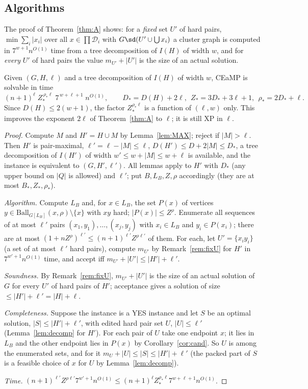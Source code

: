 \subsection{Algorithms}
\begin{remark}\label{rem:fixU}
The proof of Theorem~\ref{thm:A} shows: for a \emph{fixed} set $U'$ of hard pairs, $\min\sum_i|x_i|$ over all $x\in\prod\mathcal D_i$ with $G\sd(U'\cup\bigcup x_i)$ a cluster graph is computed in $7^{w+1}n^{O(1)}$ time from a tree decomposition of $I(H)$ of width $w$, and for \emph{every} $U'$ of hard pairs the value $m_{U'}+|U'|$ is the size of an actual solution.
\end{remark}

\begin{theorem}\label{thm:nl}
Given $(G,H,\ell)$ and a tree decomposition of $I(H)$ of width $w$, CEaMP is solvable in time
\[
(n+1)^{\ell}\;Z_*^{\,\rho_*\ell}\;7^{\,w+\ell+1}\;n^{O(1)},\qquad D_*=D(H)+2\ell,\ \ Z_*=3D_*+3\ell+1,\ \ \rho_*=2D_*+\ell .
\]
Since $D(H)\le2(w+1)$, the factor $Z_*^{\rho_*\ell}$ is a function of $(\ell,w)$ only. This improves the exponent $2\ell$ of Theorem~\ref{thm:A} to $\ell$; it is still XP in $\ell$.
\end{theorem}
\begin{proof}
Compute $M$ and $H'=H\cup M$ by Lemma~\ref{lem:MAX}; reject if $|M|>\ell$. Then $H'$ is pair-maximal, $\ell'=\ell-|M|\le\ell$, $D(H')\le D+2|M|\le D_*$, a tree decomposition of $I(H')$ of width $w'\le w+|M|\le w+\ell$ is available, and the instance is equivalent to $(G,H',\ell')$. All lemmas apply to $H'$ with $D_*$ (any upper bound on $|Q|$ is allowed) and $\ell'$; put $B,L_B,Z,\rho$ accordingly (they are at most $B_*,Z_*,\rho_*$).

\emph{Algorithm.} Compute $L_B$ and, for $x\in L_B$, the set $P(x)$ of vertices $y\in\mathrm{Ball}_{G[L_B]}(x,\rho)\setminus\{x\}$ with $xy$ hard; $|P(x)|\le Z^{\rho}$. Enumerate all sequences of at most $\ell'$ pairs $(x_1,y_1),\dots,(x_j,y_j)$ with $x_i\in L_B$ and $y_i\in P(x_i)$; there are at most $(1+nZ^{\rho})^{\ell'}\le(n+1)^{\ell'}Z^{\rho\ell'}$ of them. For each, let $U'=\{x_iy_i\}$ (a set of at most $\ell'$ hard pairs), compute $m_{U'}$ by Remark~\ref{rem:fixU} for $H'$ in $7^{w'+1}n^{O(1)}$ time, and accept iff $m_{U'}+|U'|\le|H'|+\ell'$.

\emph{Soundness.} By Remark~\ref{rem:fixU}, $m_{U'}+|U'|$ is the size of an actual solution of $G$ for every $U'$ of hard pairs of $H'$; acceptance gives a solution of size $\le|H'|+\ell'=|H|+\ell$.

\emph{Completeness.} Suppose the instance is a YES instance and let $S$ be an optimal solution, $|S|\le|H'|+\ell'$, with edited hard pair set $U$, $|U|\le\ell'$ (Lemma~\ref{lem:decomp} for $H'$). For each pair of $U$ take one endpoint $x$; it lies in $L_B$ and the other endpoint lies in $P(x)$ by Corollary~\ref{cor:cand}. So $U$ is among the enumerated sets, and for it $m_U+|U|\le|S|\le|H'|+\ell'$ (the packed part of $S$ is a feasible choice of $x$ for $U$ by Lemma~\ref{lem:decomp}).

\emph{Time.} $(n+1)^{\ell'}Z^{\rho\ell'}7^{w'+1}n^{O(1)}\le(n+1)^{\ell}Z_*^{\rho_*\ell}7^{w+\ell+1}n^{O(1)}$.
\end{proof}
